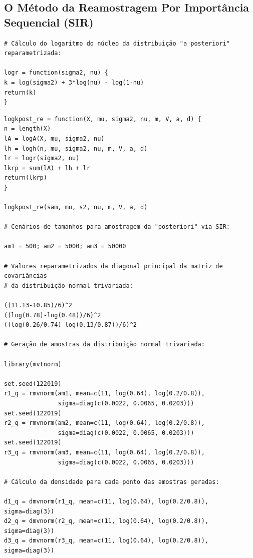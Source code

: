 \documentclass[12pt,reqno,a4paper,oneside]{article}
\begin{document}
\subsection*{O Método da Reamostragem Por Importância Sequencial (SIR)}

\begin{verbatim}
# Cálculo do logaritmo do núcleo da distribuição "a posteriori" reparametrizada:

logr = function(sigma2, nu) {
k = log(sigma2) + 3*log(nu) - log(1-nu)
return(k)
}
\end{verbatim}

\newpage

\begin{verbatim}
logkpost_re = function(X, mu, sigma2, nu, m, V, a, d) {
n = length(X)
lA = logA(X, mu, sigma2, nu)
lh = logh(n, mu, sigma2, nu, m, V, a, d)
lr = logr(sigma2, nu)
lkrp = sum(lA) + lh + lr
return(lkrp)
}

logkpost_re(sam, mu, s2, nu, m, V, a, d)

# Cenários de tamanhos para amostragem da "posteriori" via SIR:

am1 = 500; am2 = 5000; am3 = 50000

# Valores reparametrizados da diagonal principal da matriz de covariâncias
# da distribuição normal trivariada:

((11.13-10.85)/6)^2
((log(0.78)-log(0.48))/6)^2
((log(0.26/0.74)-log(0.13/0.87))/6)^2

# Geração de amostras da distribuição normal trivariada:

library(mvtnorm)

set.seed(122019)
r1_q = rmvnorm(am1, mean=c(11, log(0.64), log(0.2/0.8)),
			   sigma=diag(c(0.0022, 0.0065, 0.0203)))
set.seed(122019)
r2_q = rmvnorm(am2, mean=c(11, log(0.64), log(0.2/0.8)),
			   sigma=diag(c(0.0022, 0.0065, 0.0203)))
set.seed(122019)
r3_q = rmvnorm(am3, mean=c(11, log(0.64), log(0.2/0.8)),
			   sigma=diag(c(0.0022, 0.0065, 0.0203)))

# Cálculo da densidade para cada ponto das amostras geradas:

d1_q = dmvnorm(r1_q, mean=c(11, log(0.64), log(0.2/0.8)), sigma=diag(3))
d2_q = dmvnorm(r2_q, mean=c(11, log(0.64), log(0.2/0.8)), sigma=diag(3))
d3_q = dmvnorm(r3_q, mean=c(11, log(0.64), log(0.2/0.8)), sigma=diag(3))
\end{verbatim}

\newpage
\end{document}
